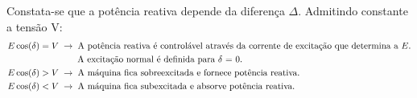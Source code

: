 \begin{mdframed}
    \noindent Constata-se que a potência reativa depende da diferença $\Delta$. Admitindo constante a tensão V:
    $$
        \begin{aligned}
            &E \cos(\delta) = V\; \rightarrow\; \text{A potência reativa é controlável através da corrente de excitação que determina a $E$.}\\
            &\mkern140mu \text{A excitação normal é definida para $\delta$ = 0.}\\
            &E \cos(\delta) > V\; \rightarrow\; \text{A máquina fica sobreexcitada e fornece potência reativa.}\\
            &E \cos(\delta) < V\; \rightarrow\; \text{A máquina fica subexcitada e absorve potência reativa.}
        \end{aligned}
    $$
\end{mdframed}

